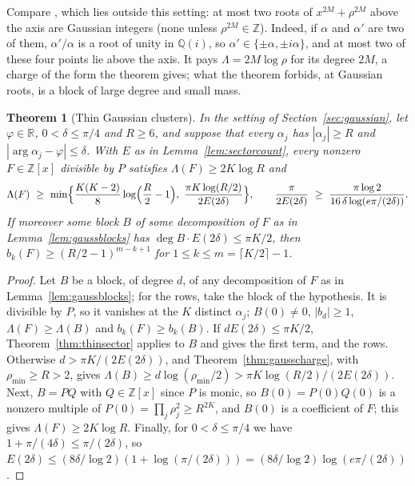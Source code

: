 \documentclass[11pt]{article}
\newtheorem{theorem}{Theorem}[section]
\newcommand{\R}{\mathbb R}
\begin{document}
Compare \cite[Proposition~3.2]{coefficient-mass-complex}, which lies outside this setting: at
most two roots of $x^{2M}+\rho^{2M}$ above the axis are Gaussian integers
(none unless $\rho^{2M}\in\mathbb Z$).  Indeed, if $\alpha$ and $\alpha'$ are
two of them, $\alpha'/\alpha$ is a root of unity in $\mathbb Q(i)$, so
$\alpha'\in\{\pm\alpha,\pm i\alpha\}$, and at most two of these four points
lie above the axis.  It
pays $\Lambda=2M\log\rho$ for its degree $2M$, a charge of the form the
theorem gives; what the theorem forbids, at Gaussian roots, is a block of
large degree and small mass.


\begin{theorem}[Thin Gaussian clusters]\label{thm:thingauss}
In the setting of Section~\ref{sec:gaussian}, let $\varphi\in\R$,
$0<\delta\le\pi/4$ and $R\ge6$, and suppose that every
$\alpha_j$ has $|\alpha_j|\ge R$ and $|\arg\alpha_j-\varphi|\le\delta$.  With
$E$ as in Lemma~\ref{lem:sectorcount}, every
nonzero $F\in\mathbb Z[x]$ divisible by $P$ satisfies $\Lambda(F)\ge2K\log R$
and
\[
  \Lambda(F)\ \ge\ \min\Bigl\{\frac{K(K-2)}8\log\Bigl(\frac R2-1\Bigr),\
  \frac{\pi K\log(R/2)}{2E(2\delta)}\Bigr\},
  \qquad
  \frac{\pi}{2E(2\delta)}\ \ge\ \frac{\pi\log2}{16\,\delta\log(e\pi/(2\delta))}.
\]
If moreover some block $B$ of some decomposition of $F$ as in
Lemma~\ref{lem:gaussblocks} has
$\deg B\cdot E(2\delta)\le\pi K/2$, then
$b_k(F)\ge(R/2-1)^{m-k+1}$ for $1\le k\le m=\lceil K/2\rceil-1$.
\end{theorem}

\begin{proof}
Let $B$ be a block, of degree $d$, of any decomposition of $F$ as in
Lemma~\ref{lem:gaussblocks}; for the rows, take the block of the hypothesis.
It is divisible by $P$, so it
vanishes at the $K$ distinct $\alpha_j$; $B(0)\ne0$, $|b_d|\ge1$,
$\Lambda(F)\ge\Lambda(B)$ and $b_k(F)\ge b_k(B)$.  If $dE(2\delta)\le\pi K/2$,
Theorem~\ref{thm:thinsector} applies to $B$ and gives the first term, and the
rows.  Otherwise $d>\pi K/(2E(2\delta))$, and Theorem~\ref{thm:gausscharge},
with $\rho_{\min}\ge R>2$, gives
$\Lambda(B)\ge d\log(\rho_{\min}/2)>\pi K\log(R/2)/(2E(2\delta))$.  Next,
$B=PQ$ with $Q\in\mathbb Z[x]$ since $P$ is monic, so $B(0)=P(0)Q(0)$ is a
nonzero multiple of $P(0)=\prod_j\rho_j^2\ge R^{2K}$, and $B(0)$ is a
coefficient of $F$; this gives $\Lambda(F)\ge2K\log R$.  Finally, for
$0<\delta\le\pi/4$ we have $1+\pi/(4\delta)\le\pi/(2\delta)$, so
$E(2\delta)\le(8\delta/\log2)(1+\log(\pi/(2\delta)))
=(8\delta/\log2)\log(e\pi/(2\delta))$.
\end{proof}
\end{document}
